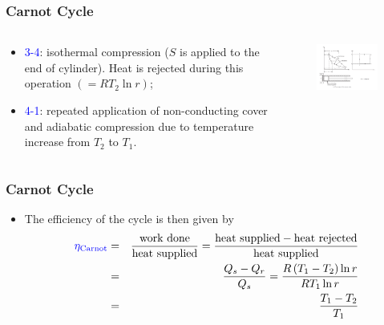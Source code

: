 \documentclass[10pt,compress]{beamer}
\begin{document}
\begin{frame}
 \frametitle{Carnot Cycle}
 \begin{columns}
  \begin{column}[c]{0.4\linewidth}
   \begin{itemize}
    \item <1-> \textcolor{blue}{3-4}: isothermal compression ($S$ is applied to the end of cylinder). Heat is rejected during this operation $\left(=RT_{2}\ln r\right)$;
    \item <2-> \textcolor{blue}{4-1}: repeated application of non-conducting cover and adiabatic compression due to temperature increase from $T_{2}$ to $T_{1}$.
   \end{itemize}
  \end{column}
  \begin{column}[c]{0.6\linewidth}
   \begin{figure}%
    \begin{center}
     \includegraphics[width=7.5cm,clip]{./Pics/GasCycle_CarnotCycle}
    \end{center}
   \end{figure}  
  \end{column}  
 \end{columns}
\end{frame}



\begin{frame}
 \frametitle{Carnot Cycle}
   \begin{itemize}
    \item <1-> The efficiency of the cycle is then given by
       \begin{eqnarray}
        \textcolor{blue}{\eta_{\text{Carnot}}} &=& \displaystyle\frac{\text{work done}}{\text{heat supplied}} = \displaystyle\frac{\text{heat supplied}-\text{heat rejected}}{\text{heat supplied}} \nonumber \\
                         &=& \displaystyle\frac{Q_{s}-Q_{r}}{Q_{s}}= \displaystyle\frac{R\left(T_{1}-T_{2}\right)\ln r}{RT_{1}\ln r} \nonumber  \\
                         &=& \displaystyle\frac{T_{1}-T_{2}}{T_{1}}\nonumber
       \end{eqnarray}
   \end{itemize}
\end{frame}
\end{document}
